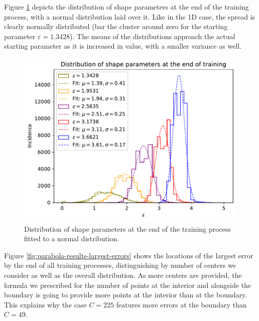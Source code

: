 \documentclass[12pt]{report} %
\begin{document}
Figure \ref{fig:parabola-results-shape-parameters} depicts the distribution of shape parameters at the end of the training process, with a normal distribution laid over it. Like in the 1D case, the spread is clearly normally distributed (bar the cluster around zero for the starting parameter $\varepsilon=1.3428$). The means of the distributions approach the actual starting parameter as it is increased in value, with a smaller variance as well.

\begin{figure}[h]
  \includegraphics[width=.8\textwidth]{imagenes/experiments/2d/statistical_2d_full_scheduler_interpolation/parabola/distribution_of_shape_parameters_at_end_of_training.pdf}
  \caption{Distribution of shape parameters at the end of the training process fitted to a normal distribution.}
  \label{fig:parabola-results-shape-parameters}
\end{figure}

Figure \ref{fig:parabola-results-largest-errors} shows the locations of the largest error by the end of all training processes, distinguishing by number of centers we consider as well as the overall distribution. As more centers are provided, the formula we prescribed for the number of points at the interior and alongside the boundary is going to provide more points at the interior than at the boundary. This explains why the case $C=225$ features more errors at the boundary than $C=49$.
\end{document}
